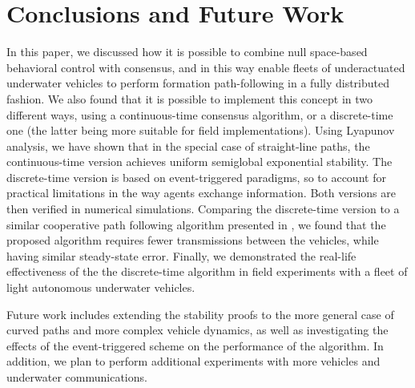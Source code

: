 \section{Conclusions and Future Work}
\label{sec:distr_NSB_conclusion}
In this paper, we discussed how it is possible to combine null space-based behavioral control with consensus, and in this way enable fleets of underactuated underwater vehicles to perform formation path-following in a fully distributed fashion. We also found that it is possible to implement this concept in two different ways, using a continuous-time consensus algorithm, or a discrete-time one (the latter being more suitable for field implementations).
Using Lyapunov analysis, we have shown that in the special case of straight-line paths, the continuous-time version achieves uniform semiglobal exponential stability.
The discrete-time version is based on event-triggered paradigms, so to account for practical limitations in the way agents exchange information.
Both versions are then verified in numerical simulations.
Comparing the discrete-time version to a similar cooperative path following algorithm presented in \cite{praveen_cooperative_2018}, we found 
that the proposed algorithm requires fewer transmissions between the vehicles, while having similar steady-state error.
Finally, we demonstrated the real-life effectiveness of the the discrete-time algorithm in field experiments with a fleet of light autonomous underwater vehicles.

Future work includes extending the stability proofs to the more general case of curved paths and more complex vehicle dynamics, as well as investigating the effects of the event-triggered scheme on the performance of the algorithm.
In addition, we plan to perform additional experiments with more vehicles and underwater communications.
